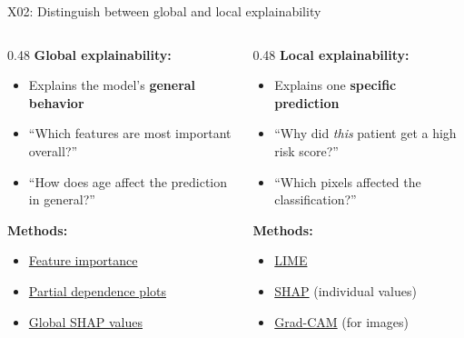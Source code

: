 \documentclass[aspectratio=169, 10pt]{beamer}
\begin{document}
\begin{frame}{X02: Distinguish between global and local explainability}
    \begin{columns}[T]
        \begin{column}{0.48\textwidth}
            \textbf{Global explainability:}
            \begin{itemize}
                \item Explains the model's \textbf{general behavior}
                \item ``Which features are most important overall?''
                \item ``How does age affect the prediction in general?''
            \end{itemize}
            
            \vspace{0.2cm}
            \textbf{Methods:}
            \begin{itemize}
                \item \href{https://en.wikipedia.org/wiki/Feature_importance}{Feature importance}
                \item \href{https://christophm.github.io/interpretable-ml-book/pdp.html}{Partial dependence plots}
                \item \href{https://shap.readthedocs.io/en/latest/example_notebooks/api_examples/plots/beeswarm.html}{Global SHAP values}
            \end{itemize}
        \end{column}
        \begin{column}{0.48\textwidth}
            \textbf{Local explainability:}
            \begin{itemize}
                \item Explains one \textbf{specific prediction}
                \item ``Why did \textit{this} patient get a high risk score?''
                \item ``Which pixels affected the classification?''
            \end{itemize}
            
            \vspace{0.2cm}
            \textbf{Methods:}
            \begin{itemize}
                \item \href{https://github.com/marcotcr/lime}{LIME}
                \item \href{https://shap.readthedocs.io/}{SHAP} (individual values)
                \item \href{https://arxiv.org/abs/1610.02391}{Grad-CAM} (for images)
            \end{itemize}
        \end{column}
    \end{columns}
    

\end{frame}
\end{document}
